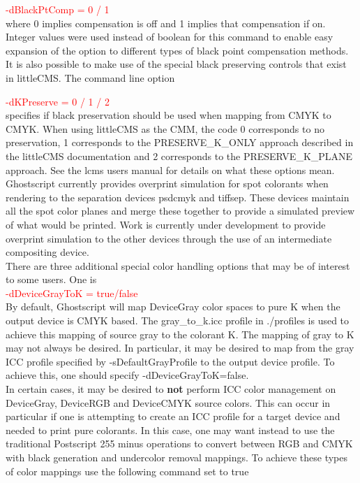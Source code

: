 \documentclass[12pt,notitlepage]{article}
\begin{document}
\textcolor{red}{-dBlackPtComp = 0 / 1}\\

\noindent where 0 implies compensation is off and 1 implies that compensation if on.  Integer values were used instead of boolean for this command to enable easy expansion of the option to different types of black point compensation methods.\\

It is also possible to make use of the special black preserving controls that exist in littleCMS.  The command line option

\textcolor{red}{-dKPreserve = 0 / 1 / 2}\\

\noindent specifies if black preservation should be used when mapping from CMYK to CMYK.   When using littleCMS as the CMM, the code 0
corresponds to no preservation, 1 corresponds to the PRESERVE\_K\_ONLY approach described in the littleCMS documentation and 2 corresponds to the PRESERVE\_K\_PLANE approach.
See the lcms users manual for details on what these options mean.\\

Ghostscript currently provides overprint simulation for spot colorants when rendering to the separation devices psdcmyk and tiffsep.  These devices maintain all the spot color planes and merge these together to provide a simulated preview of what would be printed.   Work is currently under development to provide overprint simulation to the other devices through the use of an intermediate compositing device.\\

There are three additional special color handling options that may be of interest to some users.  One is\\

\textcolor{red}{-dDeviceGrayToK = true/false}\\

\noindent By default, Ghostscript will map DeviceGray color spaces to pure K when the output device is CMYK based. The gray\_to\_k.icc profile in ./profiles is used to achieve this mapping of source gray to the colorant K.  The mapping of gray to K may not always be desired. In particular, it may be desired to map from the gray ICC profile specified by -sDefaultGrayProfile to the output device profile. To achieve this, one should specify -dDeviceGrayToK=false.\\

In certain cases, it may be desired to {\bf not} perform ICC color management on DeviceGray, DeviceRGB and DeviceCMYK source colors.  This can occur in particular if one is attempting to create an ICC profile for a target device and needed to print pure colorants.  In this case, one may want instead to use the traditional Postscript 255 minus operations to convert between RGB and CMYK with black generation and undercolor removal mappings.  To achieve these types of color mappings use the following command set to true\\
\end{document}
